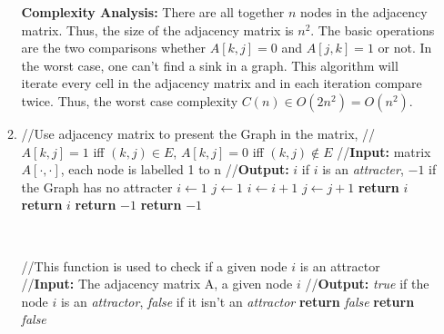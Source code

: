 \documentclass[11pt]{article}
\begin{document}
\begin{enumerate}
\begin{enumerate}
\textbf{Complexity Analysis:} There are all together $n$ nodes in the adjacency matrix. 
Thus, the size of the adjacency matrix is $n^2$. 
The basic operations are the two comparisons whether $A[k, j] = 0$ and $A[j, k] = 1$ or not. 
In the worst case, one can't find a sink in a graph. 
This algorithm will iterate every cell in the adjacency matrix and in each iteration compare twice. 
Thus, the worst case complexity $C(n)\in O(2n^2)=O(n^2)$.
\bigskip \\
\item
\begin{algorithmic}[1]
	\State //Use adjacency matrix to present the Graph in the matrix, 
	\State //$A[k, j] = 1$ iff $(k, j) \in E$, $A[k, j] = 0$ iff $(k, j) \notin E$
	\State //\textbf{Input:} matrix $A[\cdot,\cdot]$, each node is labelled 1 to n
	\State //\textbf{Output:} $i$ if $i$ is an \textit{attracter}, $-1$ if the Graph has no attracter
	\State $i\gets 1$
	\State $j\gets 1$
			\State $i\gets i+1$
		\Else
			\State $j\gets j+1$
		\EndIf
	\EndWhile
	\State \textbf{return} $i$
		\State \textbf{return} $i$
	\Else
		\State \textbf{return} $-1$
	\EndIf
	\State \textbf{return} $-1$
\EndFunction
\end{algorithmic}
~
\begin{algorithmic}[1]
	\State //This function is used to check if a given node $i$ is an attractor
	\State //\textbf{Input:} The adjacency matrix A, a given node $i$
	\State //\textbf{Output:} \emph{true} if the node $i$ is an \emph{attractor}, \emph{false} 
	if it isn't an \emph{attractor}
			\State \textbf{return} \emph{false}
		\EndIf
	\EndFor
				\State \textbf{return} \emph{false}

\end{algorithmic}
\end{enumerate}
\end{enumerate}
\end{document}
